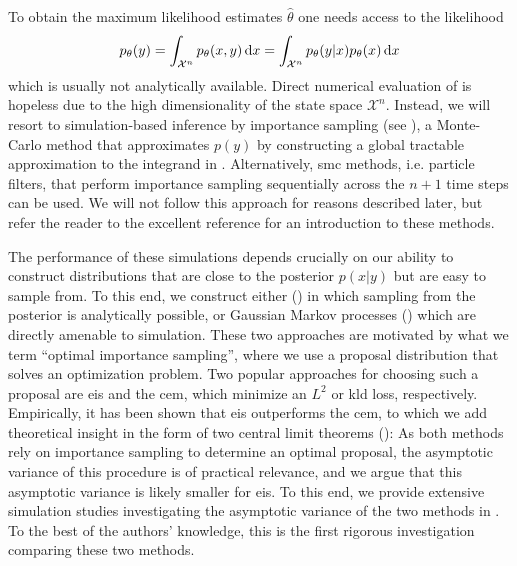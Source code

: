 To obtain the maximum likelihood estimates $\hat\theta$ one needs access to the likelihood
\begin{align}
    \label{eq:likelihood}
    p_{\theta}(y) = \int_{\mathcal X^n} p_{\theta}(x,y) \,\mathrm d x = \int_{\mathcal X^{n}} p_{\theta}(y|x) p_{\theta}(x) \,\mathrm d x
\end{align}
which is usually not analytically available.
Direct numerical evaluation of  is hopeless due to the high dimensionality of the state space $\mathcal X^n$.
Instead, we will resort to simulation-based inference by importance sampling (see ), a Monte-Carlo method that approximates $p(y)$ by constructing a global tractable approximation to the integrand in . Alternatively, \gls{smc} methods, i.e. particle filters, that perform importance sampling sequentially across the $n + 1$ time steps can be used. We will not follow this approach for reasons described later, but refer the reader to the excellent reference \citep{Chopin2020Introduction} for an introduction to these methods.

The performance of these simulations depends crucially on our ability to construct distributions that are close to the posterior $p(x|y)$ but are easy to sample from. To this end, we construct either  () in which sampling from the posterior is analytically possible, or Gaussian Markov processes () which are directly amenable to simulation.
These two approaches are motivated by what we term ``{}optimal importance sampling''{}, where we use a proposal distribution that solves an optimization problem. Two popular approaches for choosing such a proposal are \acrlong{eis} and the \acrlong{cem}, which minimize an $L^{2}$ or \acrshort{kld} loss, respectively. Empirically, it has been shown that \acrshort{eis} outperforms the \acrshort{cem}, to which we add theoretical insight in the form of two central limit theorems (): As both methods rely on importance sampling to determine an optimal proposal, the asymptotic variance of this procedure is of practical relevance, and we argue that this asymptotic variance is likely smaller for \acrshort{eis}.
To this end, we provide extensive simulation studies investigating the asymptotic variance of the two methods in . 
To the best of the authors' knowledge, this is the first rigorous investigation comparing these two methods. 

